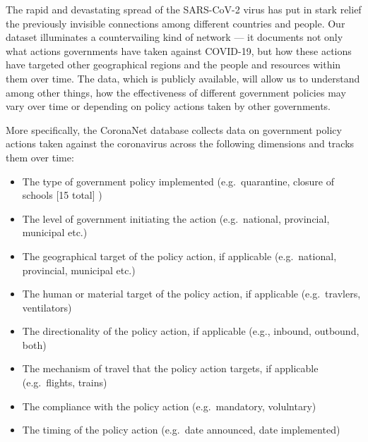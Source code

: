 \documentclass[]{article}
\providecommand{\tightlist}{%
  \setlength{\itemsep}{0pt}\setlength{\parskip}{0pt}}
\begin{document}
The rapid and devastating spread of the SARS-CoV-2 virus has put in stark relief the previously invisible connections among different countries and people. Our dataset illuminates a countervailing kind of network --- it documents not only what actions governments have taken against COVID-19, but how these actions have targeted other geographical regions and the people and resources within them over time. The data, which is publicly available, will allow us to understand among other things, how the effectiveness of different government policies may vary over time or depending on policy actions taken by other governments.

More specifically, the CoronaNet database collects data on government policy actions taken against the coronavirus across the following dimensions and tracks them over time:

\begin{itemize}
\tightlist
\item
  The type of government policy implemented (e.g.~quarantine, closure of schools {[}15 total{]} )
\item
  The level of government initiating the action (e.g.~national, provincial, municipal etc.)
\item
  The geographical target of the policy action, if applicable (e.g.~national, provincial, municipal etc.)
\item
  The human or material target of the policy action, if applicable (e.g.~travlers, ventilators)
\item
  The directionality of the policy action, if applicable (e.g., inbound, outbound, both)
\item
  The mechanism of travel that the policy action targets, if applicable (e.g.~flights, trains)
\item
  The compliance with the policy action (e.g.~mandatory, volulntary)
\item
  The timing of the policy action (e.g.~date announced, date implemented)
\end{itemize}
\end{document}

